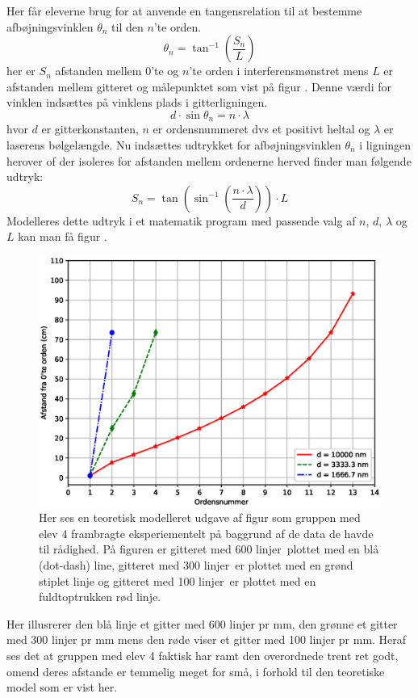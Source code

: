 Her får eleverne brug for at anvende en tangensrelation til at bestemme afbøjningsvinklen $\theta_n$ til den $n$'te orden. 
\begin{equation}
	\theta_n = \tan^{-1}\left(\frac{S_n}{L}\right)
\end{equation}
her er $S_n$ afstanden mellem 0'te og $n$'te orden i interferensmønstret mens $L$ er afstanden mellem gitteret og målepunktet som vist på figur . Denne værdi for vinklen indsættes på vinklens plads i gitterligningen.
\begin{equation}
	d\cdot\sin\theta_n = n\cdot \lambda
\end{equation}
hvor $d$ er gitterkonstanten, $n$ er ordensnummeret dvs et positivt heltal og $\lambda$ er laserens bølgelængde. Nu indsættes udtrykket for afbøjningsvinklen $\theta_n$ i ligningen herover of der isoleres for afstanden mellem ordenerne herved finder man følgende udtryk:
\begin{equation}
	S_n = \tan\left(\sin^{-1}\left(\frac{n\cdot\lambda}{d}\right)\right)\cdot L
\end{equation}
Modelleres dette udtryk i et matematik program med passende valg af $n$, $d$, $\lambda$ og $L$ kan man få figur . 
\begin{figure}[h!]
	\centering
	\includegraphics[width=\textwidth]{Figs/test}
	\caption{Her ses en teoretisk modelleret udgave af figur  som gruppen med elev 4 frambragte eksperiementelt på baggrund af de data de havde til rådighed. På figuren er gitteret med 600 linjer\per\milli\meter~plottet med en blå (dot-dash) line, gitteret med 300 linjer\per\milli\meter~er plottet med en grønd stiplet linje og gitteret med 100 linjer\per\milli\meter~er plottet med en fuldtoptrukken rød linje.}
	\label{fig:eviden.app}
\end{figure}

Her illusrerer den blå linje et gitter med 600 linjer pr mm, den grønne et gitter med 300 linjer pr mm mens den røde viser et gitter med 100 linjer pr mm. Heraf ses det at gruppen med elev 4 faktisk har ramt den overordnede trent ret godt, omend deres afstande er temmelig meget for små, i forhold til den teoretiske model som er vist her. 